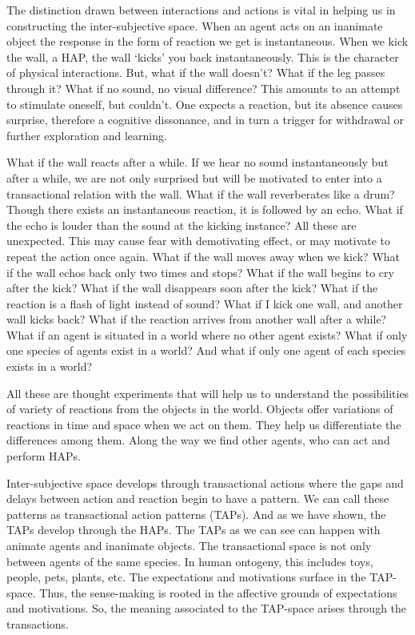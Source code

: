 {{{{{The distinction drawn between interactions and actions is vital in helping us in constructing the inter-subjective space. When an agent acts on an inanimate object the response in the form of reaction we get is instantaneous. When we kick the wall, a HAP, the wall `kicks' you back instantaneously. This is the character of physical interactions.  But, what if the wall doesn't? What if the leg passes through it? What if no sound, no visual difference?  This amounts to an attempt to stimulate oneself, but couldn't. One expects a reaction, but its absence causes surprise, therefore a cognitive dissonance, and in turn a trigger for withdrawal or further exploration and learning. 

What if the wall reacts after a while. If we hear no sound instantaneously but after a while, we are not only surprised but will be motivated to enter into a transactional relation with the wall. What if the wall reverberates like a drum? Though there exists an instantaneous reaction, it is followed by an echo.  What if the echo is louder than the sound at the kicking instance? All these are unexpected. This may cause fear with demotivating effect, or may motivate to repeat the action once again. What if the wall moves away when we kick? What if the wall echos back only two times and stops? What if the wall begins to cry after the kick? What if the wall disappears soon after the kick? What if the reaction is a flash of light instead of sound? What if I kick one wall, and another wall kicks back? What if the reaction arrives from another wall after a while? What if an agent is situated in a world where no other agent exists? What if only one species of agents exist in a world? And what if only one agent of each species exists in a world? 

All these are thought experiments that will help us to understand the possibilities of variety of reactions from the objects in the world. Objects offer variations of reactions in time and space when we act on them. They help us differentiate the differences among them. Along the way we find other agents, who can act and perform HAPs. 

Inter-subjective space develops through transactional actions where the gaps and delays between action and reaction begin to have a pattern. We can call these patterns as transactional action patterns (TAPs). And as we have shown, the TAPs develop through the HAPs. The TAPs as we can see can happen with animate agents and inanimate objects. The transactional space is not only between agents of the same species. In human ontogeny, this includes toys, people, pets, plants, etc. The expectations and motivations surface in the TAP-space. Thus, the sense-making is rooted in the affective grounds of expectations and motivations. So, the meaning associated to the TAP-space arises through the transactions. 

}}}}}
